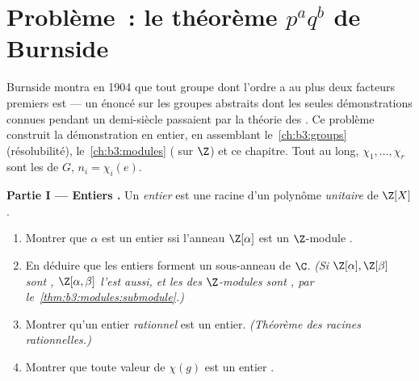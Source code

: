 \section{Problème~: le théorème \texorpdfstring{$p^aq^b$}{paqb}
de Burnside}

\begin{problem}\label{pb:b3:representations:1}
Burnside montra en 1904 que tout groupe dont l'ordre a au plus
deux facteurs premiers est  --- un énoncé sur les
groupes abstraits dont les seules démonstrations connues pendant
un demi-siècle passaient par la théorie des . Ce
problème construit la démonstration en entier, en assemblant
le~\cref{ch:b3:groups} (résolubilité),
le~\cref{ch:b3:modules} ( sur $\Z$) et ce
chapitre. Tout au long, $\chi_1, \dots, \chi_r$ sont les
  de $G$, $n_i = \chi_i(e)$.

\medskip
\noindent\textbf{Partie I --- Entiers .} Un
\emph{entier } est une racine d'un polynôme
\emph{unitaire} de $\Z[X]$.
\begin{enumerate}
  \item Montrer que $\alpha$ est un entier  ssi
        l'anneau $\Z[\alpha]$ est un $\Z$-module .
  \item En déduire que les entiers  forment un
        sous-anneau de $\C$. \emph{(Si $\Z[\alpha], \Z[\beta]$
        sont , $\Z[\alpha, \beta]$ l'est aussi, et
        les  des $\Z$-modules  sont , par le~\cref{thm:b3:modules:submodule}.)}
  \item Montrer qu'un entier  \emph{rationnel} est un
        entier. \emph{(Théorème des racines rationnelles.)}
  \item Montrer que toute valeur de  $\chi(g)$ est un
        entier .
\end{enumerate}


\end{problem}
